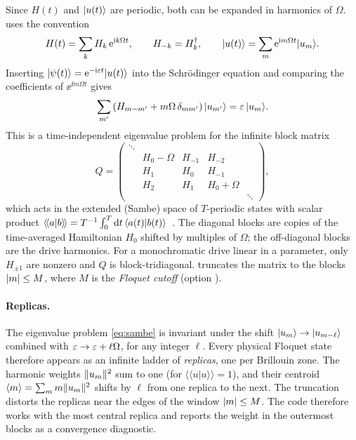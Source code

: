 Since $H(t)$ and $\lvert u(t)\rangle$ are periodic, both can be expanded in harmonics of $\Omega$.
\pkg{} uses the convention
\begin{equation}\label{eq:harmonics}
  H(t)=\sum_k H_k\,\mathrm{e}^{\mathrm{i} k\Omega t},\qquad H_{-k}=H_k^\dagger,\qquad
  \lvert u(t)\rangle=\sum_m \mathrm{e}^{\mathrm{i} m\Omega t}\lvert u_m\rangle.
\end{equation}
Inserting $\lvert \psi(t)\rangle=\mathrm{e}^{-\mathrm{i}\varepsilon t}\lvert u(t)\rangle$ into the Schr\"odinger equation and
comparing the coefficients of $\ee^{\ii m\Omega t}$ gives
\begin{equation}\label{eq:sambe}
  \sum_{m'}\left(H_{m-m'}+m\Omega\,\delta_{mm'}\right)\lvert u_{m'}\rangle=\varepsilon\,\lvert u_m\rangle.
\end{equation}
This is a time-independent eigenvalue problem for the infinite block matrix
\begin{equation}\label{eq:sambe-matrix}
  Q=\begin{pmatrix}
    \ddots & & & & \\
    & H_0-\Omega & H_{-1} & H_{-2} & \\
    & H_1 & H_0 & H_{-1} & \\
    & H_2 & H_1 & H_0+\Omega & \\
    & & & & \ddots
  \end{pmatrix},
\end{equation}
which acts in the extended (Sambe) space of $T$-periodic states with scalar product
$\langle\!\langle a\vert b\rangle\!\rangle=T^{-1}\int_0^T\mathrm{d} t\,\langle a(t)\vert b(t)\rangle$~\cite{sambe1973steady}.
The diagonal blocks are copies of the time-averaged Hamiltonian $H_0$ shifted by multiples
of $\Omega$; the off-diagonal blocks are the drive harmonics. For a monochromatic drive
linear in a parameter, only $H_{\pm1}$ are nonzero and $Q$ is block-tridiagonal. \pkg{}
truncates the matrix to the blocks $\lvert m\rvert\le M$, where $M$ is the \emph{Floquet cutoff}
(option ).

\paragraph{Replicas.}
The eigenvalue problem \eqref{eq:sambe} is invariant under the shift
$\lvert u_m\rangle\to\lvert u_{m-\ell}\rangle$ combined with $\varepsilon\to\varepsilon+\ell\Omega$, for any integer $\ell$.
Every physical Floquet state therefore appears as an infinite ladder of \emph{replicas},
one per Brillouin zone. The harmonic weights $\lVert u_m\rVert^2$ sum to one (for
$\langle\!\langle u\vert u\rangle\!\rangle=1$), and their centroid
$\langle m\rangle=\sum_m m\lVert u_m\rVert^2$ shifts by $\ell$ from one replica to the next. The
truncation distorts the replicas near the edges of the window $\lvert m\rvert\le M$. The code
therefore works with the most central replica and reports the weight in the outermost
blocks as a convergence diagnostic.

